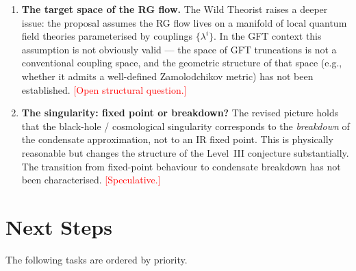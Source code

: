 \documentclass[11pt,a4paper]{article}
\begin{document}
\begin{enumerate}
  \item \textbf{The target space of the RG flow.}
    The Wild Theorist raises a deeper issue: the proposal assumes the RG flow lives on a
    manifold of local quantum field theories parameterised by couplings $\{\lambda^{i}\}$.
    In the GFT context this assumption is not obviously valid --- the space of GFT
    truncations is not a conventional coupling space, and the geometric structure of that
    space (e.g., whether it admits a well-defined Zamolodchikov metric) has not been
    established.  \textcolor{red}{[Open structural question.]}

  \item \textbf{The singularity: fixed point or breakdown?}
    The revised picture holds that the black-hole / cosmological singularity corresponds
    to the \emph{breakdown} of the condensate approximation, not to an IR fixed point.
    This is physically reasonable but changes the structure of the Level~III conjecture
    substantially.  The transition from fixed-point behaviour to condensate breakdown has
    not been characterised.
    \textcolor{red}{[Speculative.]}

\end{enumerate}

\section{Next Steps}
\label{sec:nextsteps}

The following tasks are ordered by priority.
\end{document}
